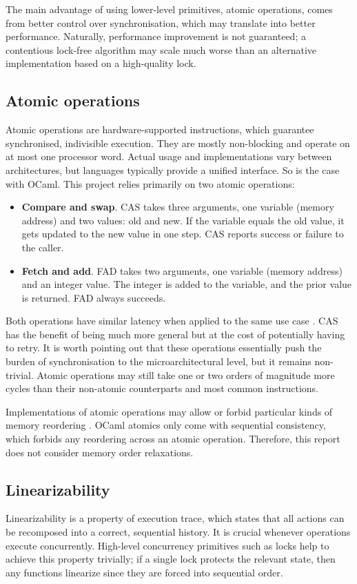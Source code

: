 \documentclass[12pt,a4paper,twoside]{report}
\begin{document}
The main advantage of using lower-level primitives, atomic operations, comes from better control over synchronisation, which may translate into better performance. Naturally, performance improvement is not guaranteed; a contentious lock-free algorithm may scale much worse than an alternative implementation based on a high-quality lock.

\subsection{Atomic operations}
Atomic operations are hardware-supported instructions, which guarantee synchronised, indivisible execution. They are mostly non-blocking and operate on at most one processor word. Actual usage and implementations vary between architectures, but languages typically provide a unified interface. So is the case with OCaml. This project relies primarily on two atomic operations:
\begin{itemize}
    \item \textbf{Compare and swap}. CAS takes three arguments, one variable (memory address) and two values: old and new. If the variable equals the old value, it gets updated to the new value in one step. CAS reports success or failure to the caller.  
    \item \textbf{Fetch and add}. FAD takes two arguments, one variable (memory address) and an integer value. The integer is added to the variable, and the prior value is returned. FAD always succeeds.  
\end{itemize}

Both operations have similar latency when applied to the same use case \cite{fad-cas-speed}. CAS has the benefit of being much more general but at the cost of potentially having to retry. It is worth pointing out that these operations essentially push the burden of synchronisation to the microarchitectural level, but it remains non-trivial. Atomic operations may still take one or two orders of magnitude more cycles than their non-atomic counterparts and most common instructions. 

Implementations of atomic operations may allow or forbid particular kinds of memory reordering \cite{memoryor11:online}. OCaml atomics only come with sequential consistency, which forbids any reordering across an atomic operation. Therefore, this report does not consider memory order relaxations.

\subsection{Linearizability}
\label{section:linearizability}
Linearizability is a property of execution trace, which states that all actions can be recomposed into a correct, sequential history. It is crucial whenever operations execute concurrently. High-level concurrency primitives such as locks help to achieve this property trivially; if a single lock protects the relevant state, then any functions linearize since they are forced into sequential order. 
\end{document}
